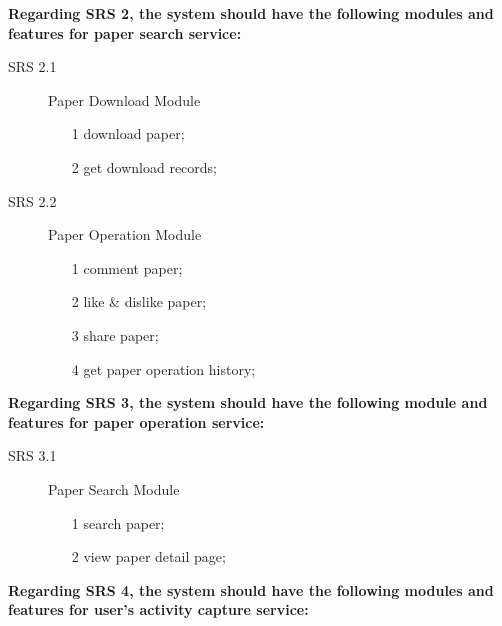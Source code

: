 \noindent
\textbf{Regarding SRS 2, the system should have the following modules and features for paper search service:}

\begin{description}
    \item[SRS 2.1] Paper Download Module
        \begin{itemize}
            \item [1]
                download paper;
            \item [2]
                get download records;
        \end{itemize} 
    \item[SRS 2.2] Paper Operation Module
        \begin{itemize}
            \item [1]
                comment paper;
            \item [2]
                like \& dislike paper;
            \item [3]
                share paper;
            \item [4]
                get paper operation history;
        \end{itemize}
\end{description}

\noindent
\textbf{Regarding SRS 3, the system should have the following module and features for paper operation service:}

\begin{description}
    \item[SRS 3.1] Paper Search Module 
        \begin{itemize}
            \item [1]
                search paper;
            \item [2]
                view paper detail page;
        \end{itemize}
\end{description}

\noindent
\textbf{Regarding SRS 4, the system should have the following modules and features for user's activity capture service:}

